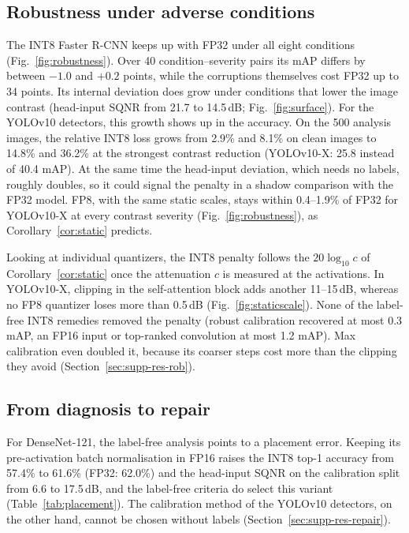 \documentclass[pdflatex,sn-mathphys-num]{sn-jnl}%
\theoremstyle{thmstyleone}%
\theoremstyle{thmstyletwo}%
\theoremstyle{thmstylethree}%
\begin{document}
\subsection{Robustness under adverse conditions}\label{sec:res-robustness}
The INT8 Faster R-CNN keeps up with FP32 under all eight conditions (Fig.~\ref{fig:robustness}). Over 40 condition--severity pairs its mAP differs by between $-1.0$ and $+0.2$ points, while the corruptions themselves cost FP32 up to 34 points. Its internal deviation does grow under conditions that lower the image contrast (head-input SQNR from 21.7 to 14.5\,dB; Fig.~\ref{fig:surface}). For the YOLOv10 detectors, this growth shows up in the accuracy. On the 500 analysis images, the relative INT8 loss grows from 2.9\% and 8.1\% on clean images to 14.8\% and 36.2\% at the strongest contrast reduction (YOLOv10-X: 25.8 instead of 40.4 mAP). At the same time the head-input deviation, which needs no labels, roughly doubles, so it could signal the penalty in a shadow comparison with the FP32 model. FP8, with the same static scales, stays within 0.4--1.9\% of FP32 for YOLOv10-X at every contrast severity (Fig.~\ref{fig:robustness}), as Corollary~\ref{cor:static} predicts.

Looking at individual quantizers, the INT8 penalty follows the $20\log_{10}c$ of Corollary~\ref{cor:static} once the attenuation $c$ is measured at the activations. In YOLOv10-X, clipping in the self-attention block adds another 11--15\,dB, whereas no FP8 quantizer loses more than 0.5\,dB (Fig.~\ref{fig:staticscale}). None of the label-free INT8 remedies removed the penalty (robust calibration recovered at most 0.3 mAP, an FP16 input or top-ranked convolution at most 1.2 mAP). Max calibration even doubled it, because its coarser steps cost more than the clipping they avoid (Section~\ref{sec:supp-res-rob}).

\subsection{From diagnosis to repair}\label{sec:res-selective}
For DenseNet-121, the label-free analysis points to a placement error. Keeping its pre-activation batch normalisation in FP16 raises the INT8 top-1 accuracy from 57.4\% to 61.6\% (FP32: 62.0\%) and the head-input SQNR on the calibration split from 6.6 to 17.5\,dB, and the label-free criteria do select this variant (Table~\ref{tab:placement}). The calibration method of the YOLOv10 detectors, on the other hand, cannot be chosen without labels (Section~\ref{sec:supp-res-repair}).
\end{document}
